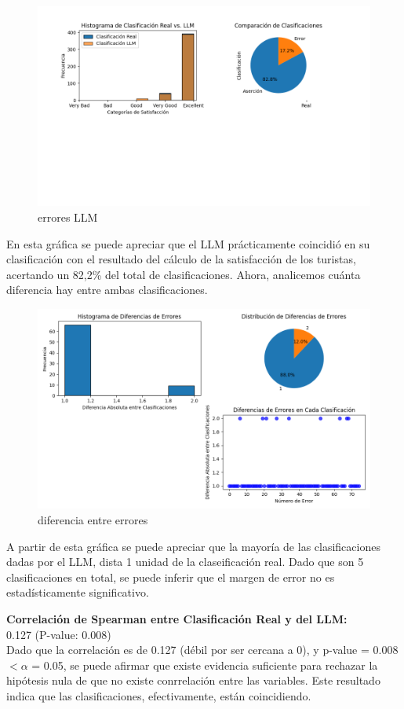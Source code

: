 \documentclass[12pt,a4paper]{article} \usepackage[spanish]{babel} \usepackage{graphicx} \usepackage{amsmath} \usepackage{amsfonts} \usepackage{amssymb} \usepackage{float} \usepackage{geometry}
\begin{document}
\begin{figure}[H] \centering \includegraphics[width=\textwidth]{LLM classif vs real satisfaction_last} \caption{errores LLM} \label{fig:etiqueta} \end{figure}
En esta gráfica se puede apreciar que el LLM prácticamente coincidió en su clasificación con el resultado del cálculo de la satisfacción de los turistas, acertando un 82,2\% del total de clasificaciones. Ahora, analicemos cuánta diferencia hay entre ambas clasificaciones.
\begin{figure}[H] \centering \includegraphics[width=\textwidth]{Diferencia de errores_last} \caption{diferencia entre errores} \label{fig:etiqueta}\end{figure}
A partir de esta gráfica se puede apreciar que la mayoría de las clasificaciones dadas por el LLM, dista 1 unidad de la claseificación real. Dado que son 5 clasificaciones en total, se puede inferir que el margen de error no es estadísticamente significativo.

\textbf{Correlación de Spearman entre Clasificación Real y del LLM:}\\
0.127 (P-value: 0.008)\\
Dado que la correlación es de 0.127 (débil por ser cercana a 0), y p-value = 0.008 $< \alpha$ = 0.05, se puede afirmar que existe evidencia suficiente para rechazar la hipótesis nula de que no existe conrrelación entre las variables. Este resultado indica que las clasificaciones, efectivamente, están coincidiendo.
\end{document}
